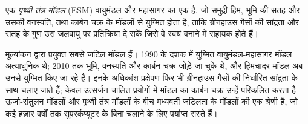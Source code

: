 \begin{omfigure}
\par{}\label{fig:b3:climate-models:grid}
\end{omfigure}

\begin{definition}[पृथ्वी तंत्र मॉडल]\label{def:b3:climate-models:esm}
एक \emph{पृथ्वी तंत्र मॉडल} (ESM) वायुमंडल और महासागर का एक  है,
जो समुद्री हिम, भूमि की सतह और उसकी वनस्पति, तथा कार्बन चक्र के मॉडलों से युग्मित होता है,
ताकि ग्रीनहाउस गैसों की सांद्रता और सतह के गुण
उस जलवायु पर प्रतिक्रिया दे सकें
जिसे वे स्वयं बनाने में सहायक होते हैं।
\end{definition}

 मूल्यांकन द्वारा प्रयुक्त सबसे जटिल मॉडल हैं। 1990 के दशक में
युग्मित वायुमंडल-महासागर मॉडल अत्याधुनिक थे;
2010 तक भूमि, वनस्पति और कार्बन चक्र जोड़े जा चुके थे,
और हिमचादर मॉडल अब उनसे युग्मित किए जा रहे हैं। इनके अधिकांश प्रक्षेपण
फिर भी ग्रीनहाउस गैसों की निर्धारित सांद्रता के साथ चलाए जाते हैं;
केवल उत्सर्जन-चालित प्रयोगों में मॉडल का कार्बन चक्र उन्हें परिकलित करता है।
ऊर्जा-संतुलन मॉडलों और पृथ्वी तंत्र मॉडलों के बीच मध्यवर्ती जटिलता के मॉडलों की एक श्रेणी है,
जो कई हज़ार
वर्षों तक सुपरकंप्यूटर के बिना चलाने के लिए पर्याप्त सस्ते हैं।

